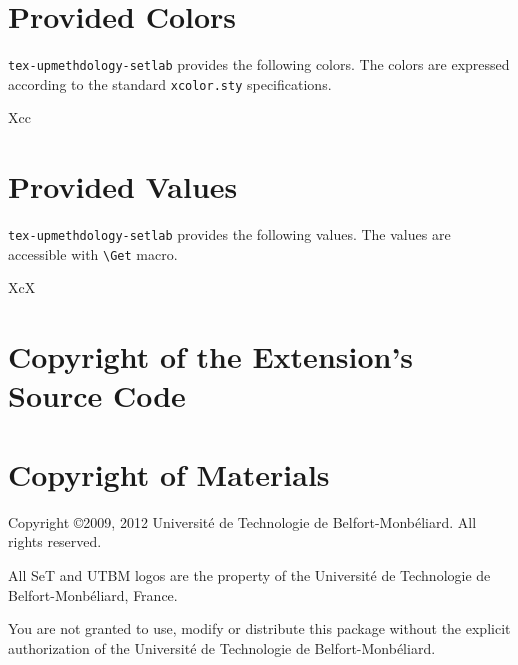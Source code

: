 \documentclass[article]{upmethodology-document}
\gdef\upmextensiondoccolorlist{}
\gdef\upmextensiondocvaluelist{}
\begin{document}
\section{Provided Colors}

\texttt{tex-upmethdology-setlab} provides the following colors. The colors are expressed according to the standard \texttt{xcolor.sty} specifications.

\begin{mtabular}{3}{Xcc}
\upmextensiondoccolorlist
\end{mtabular}

\section{Provided Values}

\texttt{tex-upmethdology-setlab} provides the following values. The values are accessible with \texttt{{\textbackslash}Get} macro.

\begin{mtabular}{3}{XcX}
\upmextensiondocvaluelist
\end{mtabular}

\section{Copyright of the Extension's Source Code}



\section{Copyright of Materials}

Copyright \copyright 2009, 2012 Universit\'e de Technologie de Belfort-Monb\'eliard. All rights reserved.

All SeT and UTBM logos are the property of the Universit\'e de Technologie de Belfort-Monb\'eliard, France.

You are not granted to use, modify or distribute this package without the explicit authorization of the Universit\'e de Technologie de Belfort-Monb\'eliard.
\end{document}
